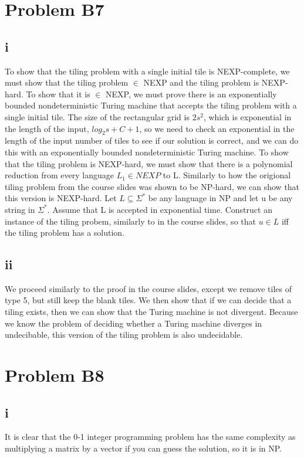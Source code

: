 \documentclass[12pt]{article}
\begin{document}
\section*{Problem B7}
\subsection*{i}
To show that the tiling problem with a single initial tile is NEXP-complete, we must show that the tiling problem $\in$ NEXP and the tiling problem is NEXP-hard. To show that it is $\in$ NEXP, we must prove there is an exponentially bounded nondeterministic Turing machine that accepts the tiling problem with a single initial tile. The size of the rectangular grid is $2s^2$, which is exponential in the length of the input, $log_2s+C+1$, so we need to check an exponential in the length of the input number of tiles to see if our solution is correct, and we can do this with an exponentially bounded nondeterministic Turing machine.
To show that the tiling problem is NEXP-hard, we must show that there is a polynomial reduction from every language $L_1 \in NEXP$ to L. Similarly to how the origional tiling problem from the course slides was shown to be NP-hard, we can show that this version is NEXP-hard.  Let $L \subseteq \Sigma^*$ be any language in NP and let u be any string in $\Sigma^*$. Assume that L is accepted in exponential time.  Construct an instance of the tiling probem, similarly to in the course slides, so that $u \in L$ iff the tiling problem has a solution.

\subsection*{ii} 
We proceed similarly to the proof in the course slides, except we remove tiles of type 5, but still keep the blank tiles.  We then show that if we can decide that a tiling exists, then we can show that the Turing machine is not divergent. Because we know the problem of deciding whether a Turing machine diverges in undecibable, this version of the tiling problem is also undecidable. 

\section*{Problem B8}
\subsection*{i}
It is clear that the 0-1 integer programming problem has the same complexity as multiplying a matrix by a vector if you can guess the solution, so it is in NP.
\end{document}
